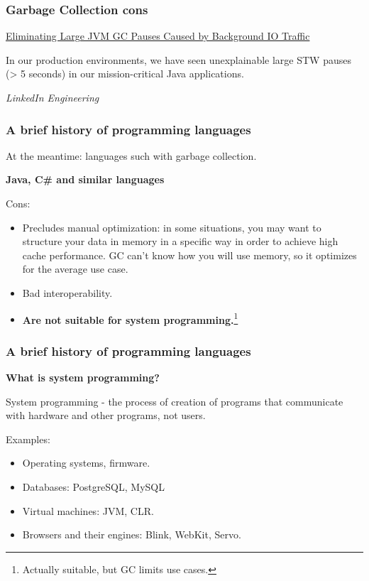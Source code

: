 \documentclass[aspectratio=1610,t]{beamer}
\begin{document}

\begin{frame}
\frametitle{Garbage Collection cons}
\href{https://engineering.linkedin.com/blog/2016/02/eliminating-large-jvm-gc-pauses-caused-by-background-io-traffic}{Eliminating Large JVM GC Pauses Caused by Background IO Traffic}

In our production environments, we have seen unexplainable large STW pauses (> 5 seconds) in our mission-critical Java applications.

\begin{flushright}\textit{LinkedIn Engineering}\end{flushright}

\end{frame}


\begin{frame}
\frametitle{A brief history of programming languages}
At the meantime: languages such with garbage collection.

\textbf{Java, C\# and similar languages}

Cons:
\begin{itemize}
    \item Precludes manual optimization: in some situations, you may want to structure your data in memory in a specific way in order to achieve high cache performance. GC can’t know how you will use memory, so it optimizes for the average use case.
    \item Bad interoperability.
    \item \textbf{Are not suitable for system programming.}\footnote{Actually suitable, but GC limits use cases.}
\end{itemize}
\end{frame}


\begin{frame}
\frametitle{A brief history of programming languages}
\textbf{What is system programming?}

System programming - the process of creation of programs that communicate with hardware and other programs, not users.

Examples:
\begin{itemize}
    \item Operating systems, firmware.
    \item Databases: PostgreSQL, MySQL
    \item Virtual machines: JVM, CLR.
    \item Browsers and their engines: Blink, WebKit, Servo.
\end{itemize}
\end{frame}
\end{document}
